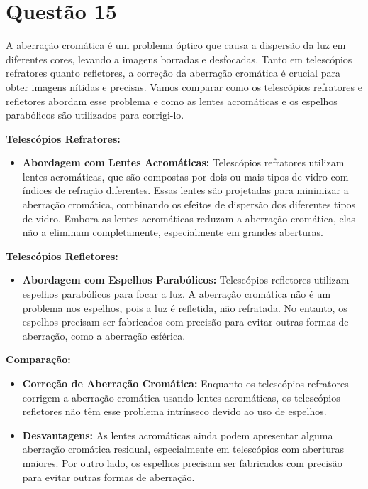 \documentclass[a4paper, 12pt]{article}
\begin{document}
\section*{Questão 15}
A aberração cromática é um problema óptico que causa a dispersão da luz em diferentes cores, levando a imagens borradas e desfocadas. Tanto em telescópios refratores quanto refletores, a correção da aberração cromática é crucial para obter imagens nítidas e precisas. Vamos comparar como os telescópios refratores e refletores abordam esse problema e como as lentes acromáticas e os espelhos parabólicos são utilizados para corrigi-lo.

\textbf{Telescópios Refratores:}
\begin{itemize}
    \item \textbf{Abordagem com Lentes Acromáticas:} Telescópios refratores utilizam lentes acromáticas, que são compostas por dois ou mais tipos de vidro com índices de refração diferentes. Essas lentes são projetadas para minimizar a aberração cromática, combinando os efeitos de dispersão dos diferentes tipos de vidro. Embora as lentes acromáticas reduzam a aberração cromática, elas não a eliminam completamente, especialmente em grandes aberturas.
\end{itemize}

\textbf{Telescópios Refletores:}
\begin{itemize}
    \item \textbf{Abordagem com Espelhos Parabólicos:} Telescópios refletores utilizam espelhos parabólicos para focar a luz. A aberração cromática não é um problema nos espelhos, pois a luz é refletida, não refratada. No entanto, os espelhos precisam ser fabricados com precisão para evitar outras formas de aberração, como a aberração esférica.
\end{itemize}

\textbf{Comparação:}
\begin{itemize}
    \item \textbf{Correção de Aberração Cromática:} Enquanto os telescópios refratores corrigem a aberração cromática usando lentes acromáticas, os telescópios refletores não têm esse problema intrínseco devido ao uso de espelhos.
    \item \textbf{Desvantagens:} As lentes acromáticas ainda podem apresentar alguma aberração cromática residual, especialmente em telescópios com aberturas maiores. Por outro lado, os espelhos precisam ser fabricados com precisão para evitar outras formas de aberração.
\end{itemize}
\end{document}
